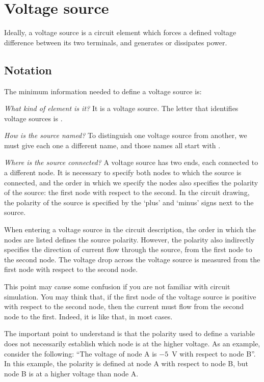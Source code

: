 \section{Voltage source}

Ideally, a voltage source is a circuit element which forces a
defined voltage difference between its two terminals, and generates
or dissipates power.

\subsection{Notation}

The minimum information needed to define a voltage source is:

\emph{What kind of element is it?} It is a voltage source. The
letter that identifies voltage sources is .

\emph{How is the source named?} To distinguish one voltage source
from another, we must give each one a different name, and those
names all start with .

\emph{Where is the source connected?} A voltage source has two ends,
each connected to a different node. It is necessary to specify both
nodes to which the source is connected, and the order in which we
specify the nodes also specifies the polarity of the source: the
first node with respect to the second. In the circuit drawing, the
polarity of the source is specified by the `plus' and `minus' signs
next to the source.

When entering a voltage source in the circuit description, the order
in which the nodes are listed defines the source polarity. However,
the polarity also indirectly specifies the direction of current flow
through the source, from the first node to the second node. The
voltage drop across the voltage source is measured from the first
node with respect to the second node.

This point may cause some confusion if you are not familiar with
circuit simulation. You may think that, if the first node of the
voltage source is positive with respect to the second node, then the
current must flow from the second node to the first. Indeed, it is
like that, in most cases.

The important point to understand is that the polarity used to
define a variable does not necessarily establish which node is at
the higher voltage. As an example, consider the following: ``The
voltage of node A is $-5$~V with respect to node B''. In this
example, the polarity is defined at node A with respect to node B,
but node B is at a higher voltage than node A.

